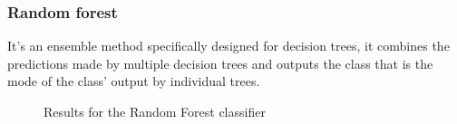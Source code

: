 \subsubsection{Random forest}
It's an ensemble method specifically designed for decision trees, it combines the predictions made by multiple decision trees and outputs the class that is the mode of the class' output by individual trees.
\begin{figure}[H]
    \centering
    \caption{Results for the Random Forest classifier}
    \label{fig:RFResults}
\end{figure}

